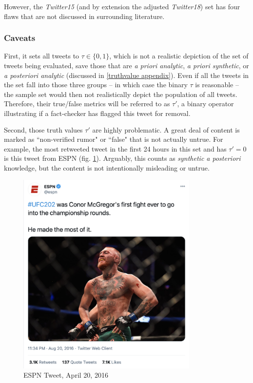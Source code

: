 \documentclass[preprint,review,12pt]{elsarticle}
\begin{document}
 However, the \textit{Twitter15} (and by extension the adjusted \textit{Twitter18}) set has four flaws that are not discussed in surrounding literature. 
 
\subsubsection{Caveats}
First, it sets all tweets to $\tau \in \{0,1\}$, which is not a realistic depiction of the set of tweets being evaluated, save those that are \textit{a priori analytic}, \textit{a priori synthetic}, or \textit{a posteriori analytic} (discussed in \ref{truthvalue appendix}). Even if all the tweets in the set fall into those three groups -- in which case the binary $\tau$ is reasonable -- the sample set would then not realistically depict the population of all tweets. Therefore, their true/false metrics will be referred to as $\tau'$, a binary operator illustrating if a fact-checker has flagged this tweet for removal.

Second, those truth values $\tau'$ are highly problematic. A great deal of content is marked as ``non-verified rumor" or ``false" that is not actually untrue. For example, the most retweeted tweet in the first 24 hours in this set and has $\tau' = 0$ is this tweet from ESPN (fig. \ref{fig:ESPN Tweet, April 20, 2016}). Arguably, this counts as \textit{synthetic a posteriori} knowledge, but the content is not intentionally misleading or untrue. 
 \begin{figure}[h!]
    \centering
    \includegraphics[width=9cm]{espn Mcgregor tweet.png}
    \caption{ESPN Tweet, April 20, 2016 \cite{espn2016tweet}}
    \label{fig:ESPN Tweet, April 20, 2016}
\end{figure}
\end{document}

